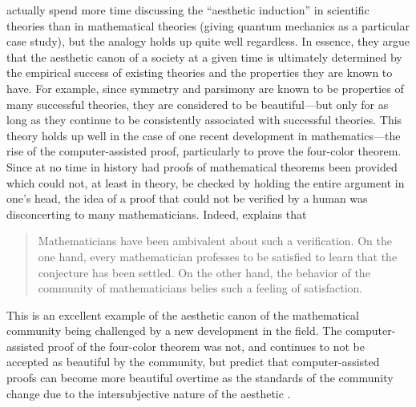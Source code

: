 \documentclass[a4paper,man,natbib]{apa6}
\begin{document}
\citeauthor{mcallister_mathematical_2005} actually spend more time discussing the ``aesthetic induction'' in scientific theories than 
in mathematical theories (giving quantum mechanics as a particular case study), but the analogy holds up quite well
regardless. In essence, they argue that the aesthetic canon of a society
at a given time is ultimately determined by the empirical success of existing theories and the properties they 
are known to have. For example, since symmetry and parsimony are known to be properties of many 
successful theories, they are considered to be beautiful---but only for as long as they continue to be consistently 
associated with successful theories. This theory holds up well in the case of one recent development in 
mathematics---the rise of the computer-assisted proof, particularly to prove the four-color theorem. Since at no
time in history had proofs of mathematical theorems been provided which could not, at least in theory, be checked 
by holding the entire argument in one's head, the idea of a proof that could not be verified by a human was
disconcerting to many mathematicians. Indeed, \cite{rota_phenomenology_1997} explains that
\begin{quotation}
      Mathematicians have been ambivalent about such a verification. On the one hand, every mathematician 
      professes to be satisfied to learn that the conjecture has been settled. On the other hand, the 
      behavior of the community of mathematicians belies such a feeling of satisfaction.
\end{quotation}
This is an excellent example of the aesthetic canon of the mathematical community being challenged by a new
development in the field. The computer-assisted proof of the four-color theorem was not, and continues to not be 
accepted as beautiful by the community, but \citeauthor{mcallister_mathematical_2005} predict that 
computer-assisted proofs can become more 
beautiful overtime as the standards of the community change due to the intersubjective nature of the 
aesthetic \citep{mcallister_mathematical_2005}.
\end{document}

